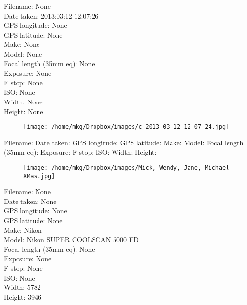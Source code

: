 
\clearpage
\recalctypearea
\newpage
\noindent
Filename: None\\ 
Date taken: 2013:03:12 12:07:26\\ 
GPS longitude: None\\ 
GPS latitude: None\\ 
Make: None\\ 
Model: None\\ 
Focal length (35mm eq): None\\ 
Exposure: None\\ 
F stop: None\\ 
ISO: None\\ 
Width: None\\ 
Height: None\\ 

\clearpage
\recalctypearea
\newpage
\noindent
\begin{figure}
    \texttt{[image: /home/mkg/Dropbox/images/c-2013-03-12\_12-07-24.jpg]}
\end{figure}

\clearpage
\recalctypearea
\newpage
\noindent
Filename: Date taken: GPS longitude: GPS latitude: Make: Model: Focal length (35mm eq): Exposure: F stop: ISO: Width: Height: 
\clearpage
\recalctypearea
\newpage
\noindent
\begin{figure}
    \texttt{[image: /home/mkg/Dropbox/images/Mick, Wendy, Jane, Michael XMas.jpg]}
\end{figure}

\clearpage
\recalctypearea
\newpage
\noindent
Filename: None\\ 
Date taken: None\\ 
GPS longitude: None\\ 
GPS latitude: None\\ 
Make: Nikon\\ 
Model: Nikon SUPER COOLSCAN 5000 ED\\ 
Focal length (35mm eq): None\\ 
Exposure: None\\ 
F stop: None\\ 
ISO: None\\ 
Width: 5782\\ 
Height: 3946\\ 

